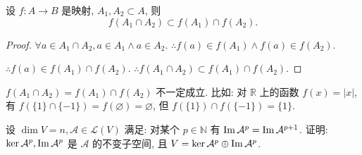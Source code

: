 \documentclass{ctexart}
\begin{document}
\begin{lemma}\label{l5.1}
    设 $f:A\to B$ 是映射, $A_1,A_2\subset A$, 则
    \[f(A_1\cap A_2)\subset f(A_1)\cap f(A_2).\]
\end{lemma}
\begin{proof}
    $\forall a\in A_1\cap A_2,a\in A_1\land a\in A_2$. $\therefore f(a)\in f(A_1)\land f(a)\in f(A_2)$.
    
    $\therefore f(a)\in f(A_1)\cap f(A_2)$. $\therefore f(A_1\cap A_2)\subset f(A_1)\cap f(A_2)$.
\end{proof}
\begin{note}
    $f(A_1\cap A_2)=f(A_1)\cap f(A_2)$ 不一定成立. 比如: 对 $\mathbb{R}$ 上的函数 $f(x)=|x|$, 有 $f(\{1\}\cap\{-1\})=f(\varnothing)=\varnothing$, 但 $f(\{1\})\cap f(\{-1\})=\{1\}$.
\end{note}
\begin{exercise}\label{ex3.3}
    设 $\dim V=n,\mathcal{A}\in\mathcal{L}(V)$ 满足: 对某个 $p\in\mathbb{N}$ 有 $\operatorname{Im} \mathcal{A}^p=\operatorname{Im} \mathcal{A}^{p+1}$. 证明: $\ker\mathcal{A}^p,\operatorname{Im} \mathcal{A}^p$ 是 $\mathcal{A}$ 的不变子空间, 且 $V=\ker\mathcal{A}^p\oplus\operatorname{Im} \mathcal{A}^p$.
\end{exercise}
\end{document}
